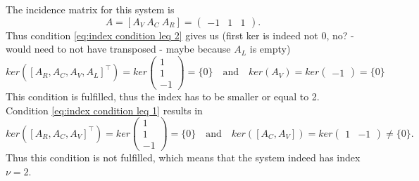 \begin{example3}
	The incidence matrix for this system is
	\begin{displaymath}
		A = [A_V~A_C~A_R] = 
		\left(
		\begin{matrix}
			-1 & 1 & 1
		\end{matrix}
		\right).
	\end{displaymath} 
	Thus condition \eqref{eq:index condition leq 2} gives us (first ker is indeed not 0, no? - would need to not have transposed - maybe because $A_L$ is empty)
	\begin{displaymath}
		ker([A_R, A_C, A_V, A_L]^\top) = ker
		\left(
		\begin{matrix}
			1 \\
			1 \\ 
			-1
		\end{matrix}
		\right) = \{0\}
		\quad \text{and} \quad 
		ker(A_V) = ker
		\left(
		\begin{matrix}
			-1
		\end{matrix}
		\right) = \{0\}
	\end{displaymath}
	This condition is fulfilled, thus the index has to be smaller or equal to 2.
	Condition \eqref{eq:index condition leq 1} results in
	\begin{displaymath}
		ker([A_R, A_C, A_V]^\top) = ker\left(
		\begin{matrix}
			1 \\
			1 \\
			-1
		\end{matrix}
		\right) = \{0\}
		\quad \text{and} \quad
		ker([A_C, A_V]) = ker
		\left(
		\begin{matrix}
			1 & -1
		\end{matrix}
		\right) \neq \{0\}.
	\end{displaymath}
	Thus this condition is not fulfilled, which means that the system indeed has index $\nu = 2$.
\end{example3}
	
